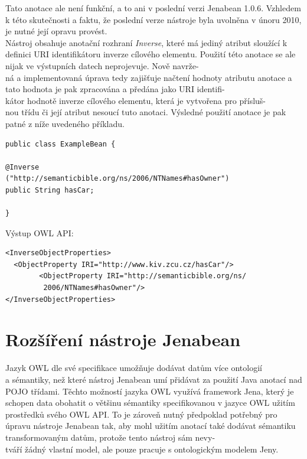 \documentclass{projekt}
\begin{document}
\begin{description}
Tato anotace ale není funkční, a to ani v poslední verzi Jenabean 1.0.6. Vzhledem k této skutečnosti a faktu, že poslední verze nástroje byla uvolněna v únoru 2010, je nutné její opravu provést.\\
Nástroj obsahuje anotační rozhraní {\it Inverse}, které má jediný atribut sloužící k definici URI identifikátoru inverze cílového elementu. Použití této anotace se ale nijak ve výstupních datech neprojevuje. Nově navrže-\\ná a implementovaná úprava tedy zajišťuje načtení hodnoty atributu anotace a tato hodnota je pak zpracována a předána jako URI identifi-\\kátor hodnotě inverze cílového elementu, která je vytvořena pro přísluš-\\nou třídu či její atribut nesoucí tuto anotaci. Výsledné použití anotace je pak patné z níže uvedeného příkladu.

\begin{verbatim}
public class ExampleBean {

@Inverse
("http://semanticbible.org/ns/2006/NTNames#hasOwner")
public String hasCar;

}
\end{verbatim}
Výstup OWL API:
\begin{verbatim}
<InverseObjectProperties>
  <ObjectProperty IRI="http://www.kiv.zcu.cz/hasCar"/>
        <ObjectProperty IRI="http://semanticbible.org/ns/
         2006/NTNames#hasOwner"/>
</InverseObjectProperties>
\end{verbatim}


\end{description}




\section{Rozšíření nástroje Jenabean}
\hspace{0.65cm}Jazyk OWL dle své specifikace \cite{patnact} umožňuje dodávat datům více ontologií \\a sémantiky, než které nástroj Jenabean umí přidávat za použití Java anotací nad POJO třídami. 
Těchto možností jazyka OWL využívá framework Jena, který je schopen data obohatit o většinu sémantiky specifikovanou v jazyce OWL užitím prostředků svého OWL API. To je zároveň nutný předpoklad potřebný pro úpravu nástroje Jenabean tak, aby mohl užitím anotací také dodávat sémantiku transformovaným datům, protože tento nástroj sám nevy-\\tváří žádný vlastní model, ale pouze pracuje s ontologickým modelem Jeny.
\end{document}
